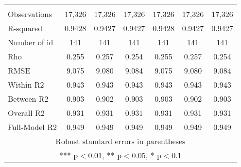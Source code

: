 \documentclass[]{article}
\begin{document}
\begin{tabular}{lcccccc}
 &  &  &  &  &  &  \\
Observations & 17,326 & 17,326 & 17,326 & 17,326 & 17,326 & 17,326 \\
R-squared & 0.9428 & 0.9427 & 0.9427 & 0.9428 & 0.9427 & 0.9427 \\
Number of id & 141 & 141 & 141 & 141 & 141 & 141 \\
Rho & 0.255 & 0.257 & 0.254 & 0.255 & 0.257 & 0.254 \\
RMSE & 9.075 & 9.080 & 9.084 & 9.075 & 9.080 & 9.084 \\
Within R2 & 0.943 & 0.943 & 0.943 & 0.943 & 0.943 & 0.943 \\
Between R2 & 0.903 & 0.902 & 0.903 & 0.903 & 0.902 & 0.903 \\
Overall R2 & 0.931 & 0.931 & 0.931 & 0.931 & 0.931 & 0.931 \\
 Full-Model R2 & 0.949 & 0.949 & 0.949 & 0.949 & 0.949 & 0.949 \\ \hline
\multicolumn{7}{c}{ Robust standard errors in parentheses} \\
\multicolumn{7}{c}{ *** p$<$0.01, ** p$<$0.05, * p$<$0.1} \\
\end{tabular}
\end{document}
